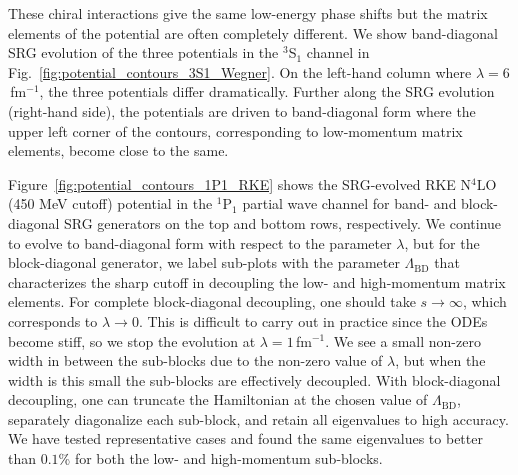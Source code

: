 \documentclass[10pt,aps,prc,floatfix,twocolumn,nofootinbib]{revtex4-1}
\newcommand{\LambdaBD}{{\Lambda_{\text{BD}}}}
\begin{document}
These chiral interactions give the same low-energy phase shifts but the matrix elements of the potential are often completely different.
We show band-diagonal SRG evolution of the three potentials in the $^3$S$_1$ channel in Fig.~\ref{fig:potential_contours_3S1_Wegner}.
On the left-hand column where $\lambda=6$\,fm$^{-1}$, the three potentials differ dramatically.
Further along the SRG evolution (right-hand side), the potentials are driven to band-diagonal form where the upper left corner of the contours, corresponding to low-momentum matrix elements, become close to the same.


Figure~\ref{fig:potential_contours_1P1_RKE} shows the SRG-evolved RKE N$^4$LO (450 MeV cutoff) potential in the $^1$P$_1$ partial wave channel for band- and block-diagonal SRG generators on the top and bottom rows, respectively.
We continue to evolve to band-diagonal form with respect to the parameter $\lambda$, but for the block-diagonal generator, we label sub-plots with the parameter $\LambdaBD$ that characterizes the sharp cutoff in decoupling the low- and high-momentum matrix elements.
For complete block-diagonal decoupling, one should take $s \rightarrow \infty$, which corresponds to $\lambda \rightarrow 0$.
This is difficult to carry out in practice since the ODEs become stiff, so we stop the evolution at $\lambda=1$\,fm$^{-1}$.
We see a small non-zero width in between the sub-blocks due to the non-zero value of $\lambda$, but when the width is this small the sub-blocks are effectively decoupled.
With block-diagonal decoupling, one can truncate the Hamiltonian at the chosen value of $\LambdaBD$, separately diagonalize each sub-block, and retain all eigenvalues to high accuracy.
We have tested representative cases and found the same eigenvalues to better than $0.1$\% for both the low- and high-momentum sub-blocks.
\end{document}
